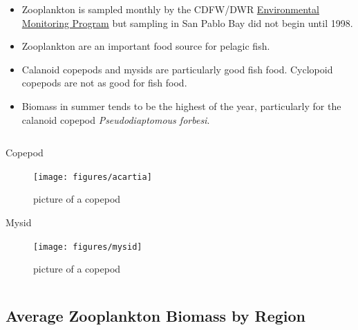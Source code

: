 \documentclass[
]{book}
\providecommand{\tightlist}{%
  \setlength{\itemsep}{0pt}\setlength{\parskip}{0pt}}
\begin{document}
\begin{columns-nocenter}

\begin{column}

\begin{itemize}
\tightlist
\item
  Zooplankton is sampled monthly by the CDFW/DWR \href{https://emp.baydeltalive.com/wiki/12297}{Environmental Monitoring Program} but sampling in San Pablo Bay did not begin until 1998.
\item
  Zooplankton are an important food source for pelagic fish.
\item
  Calanoid copepods and mysids are particularly good fish food. Cyclopoid copepods are not as good for fish food.
\item
  Biomass in summer tends to be the highest of the year, particularly for the calanoid copepod \emph{Pseudodiaptomous forbesi}.
\end{itemize}

\end{column}

\begin{column}

Copepod

\begin{figure}

{\centering \texttt{[image: figures/acartia]} 

}

\caption{picture of a copepod}\label{fig:unnamed-chunk-67}
\end{figure}

Mysid

\begin{figure}

{\centering \texttt{[image: figures/mysid]} 

}

\caption{picture of a copepod}\label{fig:unnamed-chunk-68}
\end{figure}

\end{column}

\end{columns-nocenter}

\hypertarget{average-zooplankton-biomass-by-region}{%
\subsection{Average Zooplankton Biomass by Region}\label{average-zooplankton-biomass-by-region}}
\end{document}

